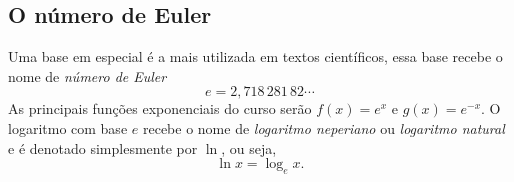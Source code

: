 \subsection{O número de Euler}

Uma base em especial é a mais utilizada em textos científicos, essa base recebe
o nome de \emph{número de Euler}
\[
  e = 2,718\,281\,82\cdots
\]
As principais funções exponenciais do curso serão $f(x)=e^x$ e $g(x)=e^{-x}$.
O logaritmo com base $e$ recebe o nome de
\emph{logaritmo neperiano} ou
\emph{logaritmo natural}
e é denotado simplesmente por $\ln$, ou seja,
\[
  \ln x = \log_e x.
\]


